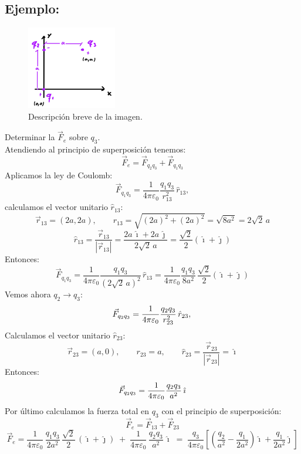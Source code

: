\documentclass[a4paper,12pt]{article}
\begin{document}
\subsection*{Ejemplo:}
\begin{figure}[h]
  \centering
  \includegraphics[width=0.35\textwidth]{imagen_1.jpeg}
  \caption{Descripción breve de la imagen.}
  \label{fig:imagen1}
\end{figure}
Determinar la $\vec{F}_e$ sobre $q_3$. \\
Atendiendo al principio de superposición tenemos:
\[
\vec{F}_e = \vec{F}_{q_2 q_3} + \vec{F}_{q_1 q_3}
\]
Aplicamos la ley de Coulomb:
\[
\vec{F}_{q_1 q_3} = \frac{1}{4\pi \varepsilon_0} \frac{q_1 q_3}{r_{13}^2} \, \hat{r}_{13}, 
\]
calculamos el vector unitario $\hat{r}_{13}$:
\[
\vec{r}_{13} = (2a,2a), 
\qquad r_{13} = \sqrt{(2a)^2+(2a)^2} = \sqrt{8a^2} = 2\sqrt{2}\,a
\]
\[
\hat{r}_{13} = \frac{\vec{r}_{13}}{|\vec{r}_{13}|} = \frac{2a\,\hat{\imath} + 2a\,\hat{\jmath}}{2\sqrt{2}\,a} 
= \frac{\sqrt{2}}{2} (\hat{\imath} + \hat{\jmath})
\]
Entonces:\\
\[
\vec{F}_{q_1 q_3} = \frac{1}{4\pi \varepsilon_0} \frac{q_1 q_3}{(2\sqrt{2}\,a)^2} \, \hat{r}_{13}
= \frac{1}{4\pi \varepsilon_0} \frac{q_1 q_3}{8a^2} \, \frac{\sqrt{2}}{2} (\hat{\imath} + \hat{\jmath})
\]
Vemos ahora $q_2 \to q_3$:\\
\[
\vec{F}_{q_2 q_3} = \frac{1}{4\pi \varepsilon_0} \frac{q_2 q_3}{r_{23}^2} \, \hat{r}_{23}, \\
\]
Calculamos el vector unitario $\hat{r}_{23}$:
\[
\vec{r}_{23} = (a,0), \qquad r_{23}=a, \qquad \hat{r}_{23} = \frac{\vec{r}_{23}}{|\vec{r}_{23}|} = \hat{\imath}
\]
Entonces:
\[
\vec{F}_{q_2 q_3} = \frac{1}{4\pi \varepsilon_0} \frac{q_2 q_3}{a^2} \, \hat{\imath}\\
\]
Por último calculamos la fuerza total en $q_3$ con el principio de superposición:
\[
\vec{F}_e = \vec{F}_{13} + \vec{F}_{23}
\]
\[
\vec{F}_e =
\frac{1}{4\pi\varepsilon_0}\,\frac{q_1 q_3}{2a^2}\,\frac{\sqrt{2}}{2}\,(\hat{\imath}+\hat{\jmath})
\;+\;
\frac{1}{4\pi\varepsilon_0}\,\frac{q_2 q_3}{a^2}\,\hat{\imath}
\;=\;
\frac{q_3}{4\pi\varepsilon_0}\!\left[
\left(\frac{q_2}{a^2}-\frac{q_1}{2a^2}\right)\hat{\imath}
+\frac{q_1}{2a^2}\hat{\jmath}
\right]
\]
\end{document}
